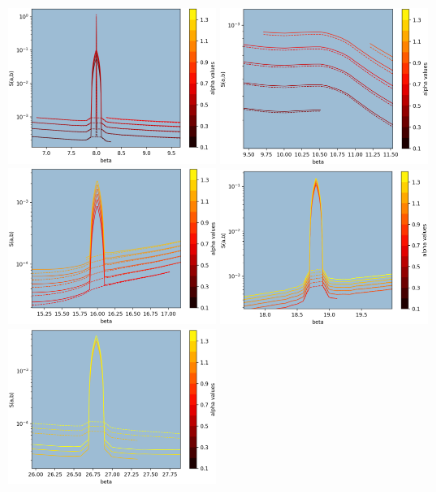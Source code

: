 \documentclass[Master.tex]{subfiles}
\begin{document}
    \begin{figure}[h]
      \begin{center}
        \includegraphics[width=0.49\textwidth]{sab_thinTriangle_and_delta_all_AB_Zoomed_8}
        \includegraphics[width=0.49\textwidth]{sab_thinTriangle_and_delta_all_AB_Zoomed_10}
        \includegraphics[width=0.49\textwidth]{sab_thinTriangle_and_delta_all_AB_Zoomed_16}
        \includegraphics[width=0.49\textwidth]{sab_thinTriangle_and_delta_all_AB_Zoomed_18}
        \includegraphics[width=0.49\textwidth]{sab_thinTriangle_and_delta_all_AB_Zoomed_26}

\end{center}
\end{figure}
\end{document}
